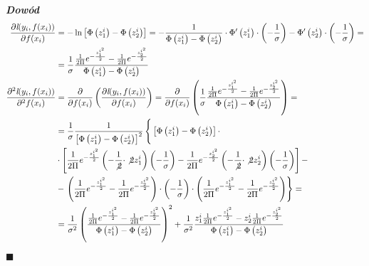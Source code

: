 \documentclass[12pt,a4paper]{article}
\newenvironment{dow}{\textbf{\textit{Dowód}}}{\begin{flushright} $\blacksquare$ \end{flushright}}
\begin{document}
\begin{dow}
\begin{align*}
\frac{\partial\textit{l}(y_i, f(x_i))}{\partial f(x_i)} 
&= -\ln\left[\Phi\left( z_1^i \right) - \Phi\left( z_2^i \right)\right] = -\frac{1}{\Phi\left( z_1^i \right) - \Phi\left( z_2^i \right)}\cdot \Phi'\left( z_1^i \right)\cdot \left( -\frac{1}{\sigma} \right) - \Phi'\left( z_2^i \right)\cdot \left( -\frac{1}{\sigma} \right) = \\
&= \frac{1}{\sigma}\frac{\frac{1}{2\Pi}e^{-\frac{z_1^{i^2}}{2}}-\frac{1}{2\Pi}e^{-\frac{z_2^{i^2}}{2}}}{\Phi\left( z_1^i \right) - \Phi\left( z_2^i \right)}\\
\frac{\partial^2\textit{l}(y_i, f(x_i))}{\partial^2 f(x_i)} 
&= \frac{\partial}{\partial f(x_i)}\left( \frac{\partial\textit{l}(y_i, f(x_i))}{\partial f(x_i)} \right) = \frac{\partial}{\partial f(x_i)}\left( \frac{1}{\sigma}\frac{\frac{1}{2\Pi}e^{-\frac{z_1^{i^2}}{2}}-\frac{1}{2\Pi}e^{-\frac{z_2^{i^2}}{2}}}{\Phi\left( z_1^i \right) - \Phi\left( z_2^i \right)} \right) =\\
&= \frac{1}{\sigma}\frac{1}{\left[\Phi\left( z_1^i \right) - \Phi\left( z_2^i \right)\right]^2} \left\lbrace  
\vphantom{\left( 
\frac{1}{2\Pi}
e^{-\frac{z_1^{i^2}}{2}}
-
\frac{1}{2\Pi}
e^{-\frac{z_2^{i^2}}{2}} 
\right)
\cdot
\left(
-\frac{1}{\sigma} 
\right) 
\cdot 
\left( 
\frac{1}{2\Pi}e^{-\frac{z_1^{i^2}}{2}}-\frac{1}{2\Pi}e^{-\frac{z_2^{i^2}}{2}} 
\right)}
  \left[\Phi\left( z_1^i \right) - \Phi\left( z_2^i \right)\right]\cdot\right.\\
&\cdot \left[ 
\dfrac{1}{2\Pi}e^{-\frac{z_1^{i^2}}{2}}\left(-\frac{1}{\not{2}}\cdot \not{2}z_1^i\right)\left(-\frac{1}{\sigma} \right) -     
 \dfrac{1}{2\Pi}e^{-\frac{z_2^{i^2}}{2}}\left(-\frac{1}{\not{2}}\cdot \not{2}z_2^i\right)\left(-\frac{1}{\sigma} \right) \right] -\\
&- 
\left. 
\left( 
\frac{1}{2\Pi}
e^{-\frac{z_1^{i^2}}{2}}
-
\frac{1}{2\Pi}
e^{-\frac{z_2^{i^2}}{2}} 
\right)
\cdot
\left(
-\frac{1}{\sigma} 
\right) 
\cdot 
\left( 
\frac{1}{2\Pi}e^{-\frac{z_1^{i^2}}{2}}-\frac{1}{2\Pi}e^{-\frac{z_2^{i^2}}{2}} 
\right)
\right\rbrace =\\
&=\frac{1}{\sigma^2}\left( \frac{\frac{1}{2\Pi}e^{-\frac{z_1^{i^2}}{2}}-\frac{1}{2\Pi}e^{-\frac{z_2^{i^2}}{2}}}{\Phi\left( z_1^i \right) - \Phi\left( z_2^i \right)} \right)^2 + \frac{1}{\sigma^2}\frac{z_1^i\frac{1}{2\Pi}e^{-\frac{z_1^{i^2}}{2}}-z_2^i\frac{1}{2\Pi}e^{-\frac{z_2^{i^2}}{2}}}{\Phi\left( z_1^i \right) - \Phi\left( z_2^i \right)}
\end{align*}

\end{dow}
\end{document}

